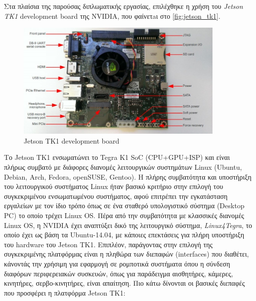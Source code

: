 Στα πλαίσια της παρούσας διπλωματικής εργασίας, επιλέχθηκε η χρήση του
\emph{Jetson TK1} development board της NVIDIA, που φαίνετaι στο \autoref{fig:jetson_tk1}.
\begin{figure}[!ht]
  \centering
  \includegraphics[width=0.9\textwidth]{./images/chapter4/jetson-tk1-labelled.jpg}
  \caption[Jetson TK1 development board]{Jetson TK1 development board}
  \label{fig:jetson_tk1}
\end{figure}
Το Jetson TK1 ενσωματώνει το Tegra K1 SoC (CPU+GPU+ISP)
και είναι πλήρως συμβατό με διάφορες διανομές λειτουργικών συστημάτων Linux (Ubuntu, Debian, Arch, Fedora, openSUSE, Gentoo).
Η πλήρης συμβατότητα και υποστήριξη του λειτουργικού συστήματος Linux ήταν βασικό κριτήριο
στην επιλογή του συγκεκριμένου ενσωματωμένου συστήματος, αφού επιτρέπει την
εγκατάσταση εργαλείων με τον ίδιο τρόπο όπως σε ένα σταθερό υπολογιστικό σύστημα (Desktop PC)
το οποίο τρέχει Linux OS. Πέρα από την συμβατότητα με κλασσικές διανομές Linux OS,
η NVIDIA έχει αναπτύξει δικό της λειτουργικό σύστημα, \emph{Linux4Tegra}, το οποίο
έχει ως βάση τα Ubuntu-14.04, με κάποιες επεκτάσεις για πλήρη υποστήριξη του hardware του Jetson TK1.
Επιπλέον, παράγοντας στην επιλογή της συγκεκριμένης πλατφόρμας είναι η πληθώρα των διεπαφών (interfaces) που
διαθέτει, κάνοντάς την χρήσιμη για εφαρμογή σε ρομποτικά συστήματα όπου η σύνδεση διαφόρων περιφερειακών συσκευών,
όπως για παράδειγμα αισθητήρες, κάμερες, κινητήρες, σερβο-κινητήρες, είναι απαίτηση.
Πιο κάτω δίνονται οι βασικές διεπαφές που προσφέρει η πλατφόρμα Jetson TK1:
